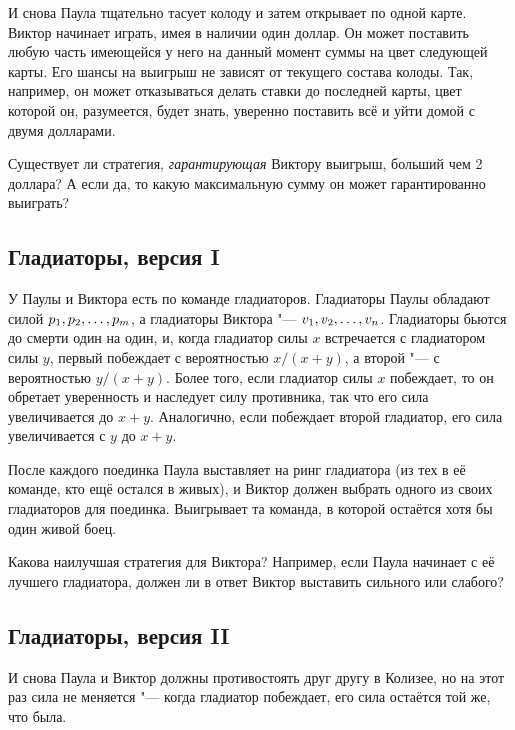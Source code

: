 \documentclass[twoside]{book}
\makeatletter
\newcommand{\rindex}[2][\imki@jobname]{%
  \index[#1]{\detokenize{#2}}%
}
\makeatother
\begin{document}
И снова Паула тщательно тасует колоду и затем открывает по одной карте.
Виктор начинает играть, имея в наличии один доллар.
Он может поставить  любую часть имеющейся у него на данный момент суммы на цвет следующей карты.
Его шансы на выигрыш не зависят от текущего состава колоды.
Так, например, он может отказываться делать ставки до последней карты, цвет которой он, разумеется, будет знать, уверенно поставить всё и уйти домой с двумя долларами.

\medskip

Существует ли стратегия, \emph{гарантирующая} Виктору выигрыш, больший чем 2 доллара?
А если да, то какую максимальную сумму он может гарантированно выиграть? 

\subsection*{Гладиаторы, версия I} %
\rindex{Гладиаторы, версия I}

У Паулы и Виктора есть по команде гладиаторов.
Гладиаторы Паулы обладают силой $p_1, p_2,\z\dots, p_m$, а гладиаторы Виктора "--- $v_1, v_2,\z\dots, v_n$.
Гладиаторы бьются до смерти один на один, и, когда гладиатор силы $x$ встречается с гладиатором силы $y$, первый побеждает с вероятностью $x/(x+y)$, а второй "--- с вероятностью $y/(x+y)$.
Более того, если гладиатор силы $x$ побеждает, то он обретает уверенность и наследует силу противника, так что его сила увеличивается до $x+y$.
Аналогично, если побеждает второй гладиатор, его сила увеличивается с $y$ до $x+y$.

После каждого поединка Паула выставляет на ринг гладиатора (из тех в её команде, кто ещё остался в живых), и Виктор должен выбрать одного из своих гладиаторов для поединка.
Выигрывает та команда, в которой остаётся хотя бы один живой боец.

\medskip

Какова наилучшая стратегия для Виктора?
Например, если Паула начинает с её лучшего гладиатора, должен ли в ответ Виктор выставить сильного или слабого?

\pagebreak[3]

\subsection*{Гладиаторы, версия II} %
\rindex{Гладиаторы, версия II}

И снова Паула и Виктор должны противостоять друг другу в Колизее, но на этот раз сила не меняется "--- когда гладиатор побеждает, его сила остаётся той же, что была.
\end{document}
